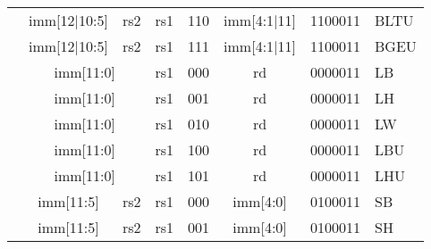 \begin{table}[p]
\begin{small}
\begin{center}
\begin{tabular}{p{0in}p{0.4in}p{0.05in}p{0.05in}p{0.05in}p{0.05in}p{0.4in}p{0.6in}p{0.4in}p{0.6in}p{0.7in}l}
        &
        \multicolumn{4}{|c|}{imm[12$\vert$10:5]} &
        \multicolumn{2}{c|}{rs2} &
        \multicolumn{1}{c|}{rs1} &
        \multicolumn{1}{c|}{110} &
        \multicolumn{1}{c|}{imm[4:1$\vert$11]} &
        \multicolumn{1}{c|}{1100011} & BLTU \\
        \cline{2-11}


        &
        \multicolumn{4}{|c|}{imm[12$\vert$10:5]} &
        \multicolumn{2}{c|}{rs2} &
        \multicolumn{1}{c|}{rs1} &
        \multicolumn{1}{c|}{111} &
        \multicolumn{1}{c|}{imm[4:1$\vert$11]} &
        \multicolumn{1}{c|}{1100011} & BGEU \\
        \cline{2-11}


        &
        \multicolumn{6}{|c|}{imm[11:0]} &
        \multicolumn{1}{c|}{rs1} &
        \multicolumn{1}{c|}{000} &
        \multicolumn{1}{c|}{rd} &
        \multicolumn{1}{c|}{0000011} & LB \\
        \cline{2-11}


        &
        \multicolumn{6}{|c|}{imm[11:0]} &
        \multicolumn{1}{c|}{rs1} &
        \multicolumn{1}{c|}{001} &
        \multicolumn{1}{c|}{rd} &
        \multicolumn{1}{c|}{0000011} & LH \\
        \cline{2-11}


        &
        \multicolumn{6}{|c|}{imm[11:0]} &
        \multicolumn{1}{c|}{rs1} &
        \multicolumn{1}{c|}{010} &
        \multicolumn{1}{c|}{rd} &
        \multicolumn{1}{c|}{0000011} & LW \\
        \cline{2-11}


        &
        \multicolumn{6}{|c|}{imm[11:0]} &
        \multicolumn{1}{c|}{rs1} &
        \multicolumn{1}{c|}{100} &
        \multicolumn{1}{c|}{rd} &
        \multicolumn{1}{c|}{0000011} & LBU \\
        \cline{2-11}


        &
        \multicolumn{6}{|c|}{imm[11:0]} &
        \multicolumn{1}{c|}{rs1} &
        \multicolumn{1}{c|}{101} &
        \multicolumn{1}{c|}{rd} &
        \multicolumn{1}{c|}{0000011} & LHU \\
        \cline{2-11}


        &
        \multicolumn{4}{|c|}{imm[11:5]} &
        \multicolumn{2}{c|}{rs2} &
        \multicolumn{1}{c|}{rs1} &
        \multicolumn{1}{c|}{000} &
        \multicolumn{1}{c|}{imm[4:0]} &
        \multicolumn{1}{c|}{0100011} & SB \\
        \cline{2-11}


        &
        \multicolumn{4}{|c|}{imm[11:5]} &
        \multicolumn{2}{c|}{rs2} &
        \multicolumn{1}{c|}{rs1} &
        \multicolumn{1}{c|}{001} &
        \multicolumn{1}{c|}{imm[4:0]} &
        \multicolumn{1}{c|}{0100011} & SH \\
        \cline{2-11}


\end{tabular}
\end{center}
\end{small}
\end{table}
